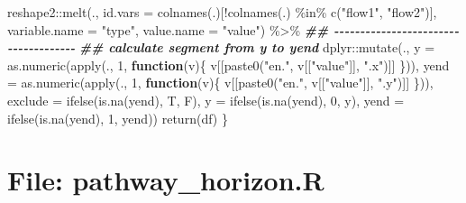 \documentclass[
]{article}
\newenvironment{Shaded}{\begin{snugshade}}{\end{snugshade}}
\newcommand{\AttributeTok}[1]{\textcolor[rgb]{0.77,0.63,0.00}{#1}}
\newcommand{\ControlFlowTok}[1]{\textcolor[rgb]{0.13,0.29,0.53}{\textbf{#1}}}
\newcommand{\DecValTok}[1]{\textcolor[rgb]{0.00,0.00,0.81}{#1}}
\newcommand{\DocumentationTok}[1]{\textcolor[rgb]{0.56,0.35,0.01}{\textbf{\textit{#1}}}}
\newcommand{\FunctionTok}[1]{\textcolor[rgb]{0.00,0.00,0.00}{#1}}
\newcommand{\NormalTok}[1]{#1}
\newcommand{\SpecialCharTok}[1]{\textcolor[rgb]{0.00,0.00,0.00}{#1}}
\newcommand{\StringTok}[1]{\textcolor[rgb]{0.31,0.60,0.02}{#1}}
\begin{document}
\begin{Shaded}
\begin{Highlighting}[]
\NormalTok{  reshape2}\SpecialCharTok{::}\FunctionTok{melt}\NormalTok{(., }\AttributeTok{id.vars =} \FunctionTok{colnames}\NormalTok{(.)[}\SpecialCharTok{!}\FunctionTok{colnames}\NormalTok{(.) }\SpecialCharTok{\%in\%} \FunctionTok{c}\NormalTok{(}\StringTok{"flow1"}\NormalTok{, }\StringTok{"flow2"}\NormalTok{)],}
                 \AttributeTok{variable.name =} \StringTok{"type"}\NormalTok{,}
                 \AttributeTok{value.name =} \StringTok{"value"}\NormalTok{) }\SpecialCharTok{\%\textgreater{}\%} 
  \DocumentationTok{\#\# {-}{-}{-}{-}{-}{-}{-}{-}{-}{-}{-}{-}{-}{-}{-}{-}{-}{-}{-}{-}{-}{-}{-}{-}{-}{-}{-}{-}{-}{-}{-}{-}{-}{-}{-}{-}{-} }
  \DocumentationTok{\#\# calculate segment from y to yend}
\NormalTok{  dplyr}\SpecialCharTok{::}\FunctionTok{mutate}\NormalTok{(., }\AttributeTok{y =} \FunctionTok{as.numeric}\NormalTok{(}\FunctionTok{apply}\NormalTok{(., }\DecValTok{1}\NormalTok{, }\ControlFlowTok{function}\NormalTok{(v)\{}
\NormalTok{                                          v[[}\FunctionTok{paste0}\NormalTok{(}\StringTok{"en."}\NormalTok{, v[[}\StringTok{"value"}\NormalTok{]], }\StringTok{".x"}\NormalTok{)]]}
\NormalTok{                                            \})),}
                \AttributeTok{yend =} \FunctionTok{as.numeric}\NormalTok{(}\FunctionTok{apply}\NormalTok{(., }\DecValTok{1}\NormalTok{, }\ControlFlowTok{function}\NormalTok{(v)\{}
\NormalTok{                                          v[[}\FunctionTok{paste0}\NormalTok{(}\StringTok{"en."}\NormalTok{, v[[}\StringTok{"value"}\NormalTok{]], }\StringTok{".y"}\NormalTok{)]]}
\NormalTok{                                            \})),}
                \AttributeTok{exclude =} \FunctionTok{ifelse}\NormalTok{(}\FunctionTok{is.na}\NormalTok{(yend), T, F),}
                \AttributeTok{y =} \FunctionTok{ifelse}\NormalTok{(}\FunctionTok{is.na}\NormalTok{(yend), }\DecValTok{0}\NormalTok{, y),}
                \AttributeTok{yend =} \FunctionTok{ifelse}\NormalTok{(}\FunctionTok{is.na}\NormalTok{(yend), }\DecValTok{1}\NormalTok{, yend))}
  \FunctionTok{return}\NormalTok{(df)}
\NormalTok{\}}
\end{Highlighting}
\end{Shaded}

\hypertarget{file-pathway_horizon.r}{%
\section{File: pathway\_horizon.R}\label{file-pathway_horizon.r}}
\end{document}
